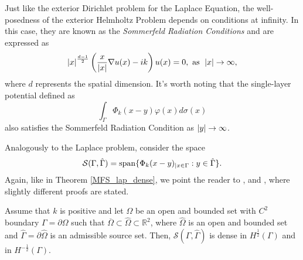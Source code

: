 \begin{remark}\label{sommerfeld_conditions}
    Just like the exterior Dirichlet problem for the Laplace Equation, the well-posedness of the exterior Helmholtz Problem depends on conditions at infinity. In this case, they are known as the \textit{Sommerfeld Radiation Conditions} and are expressed as
    \[
        \abs{x}^\frac{d-1}{2} \left(\frac{x}{\abs{x}}\nabla u(x) - i k \right)u(x) = 0, \text{ as } \; \abs{x} \rightarrow \infty,
    \]
    where \(d\) represents the spatial dimension. It's worth noting that the single-layer potential defined as
    \[
        \int_\Gamma \Phi_k(x-y) \varphi(x) d\sigma(x)
    \]
    also satisfies the Sommerfeld Radiation Condition as \(\abs{y} \rightarrow \infty\).    
\end{remark}

Analogously to the Laplace problem, consider the space
\[
    \mathcal{S}(\Gamma, \hat{\Gamma}) = \operatorname{span}\{\Phi_k(x-y)_{|x \in \Gamma} : y \in \hat{\Gamma}\}.
\]
Again, like in Theorem \ref{MFS_lap_dense}, we point the reader to \cite{alves2009choice}, \cite{svilen_phd} and \cite{alves2005new}, where slightly different proofs are stated.

\begin{theorem}\label{MFS_helm_dense}
    Assume that \(k\) is positive and let \(\Omega\) be an open and bounded set with \(C^2\) boundary \(\Gamma = \partial \Omega\) such that \(\overline{\Omega} \subset \hat{\Omega} \subset \mathbb{R}^2\), where \(\hat{\Omega}\) is an open and bounded set and \(\hat{\Gamma} = \partial \hat{\Omega}\) is an admissible source set. Then, \(\mathcal{S}(\Gamma, \hat{\Gamma})\) is dense in \(H^\frac{1}{2}(\Gamma)\) and in \(H^{-\frac{1}{2}}(\Gamma)\).
\end{theorem}

